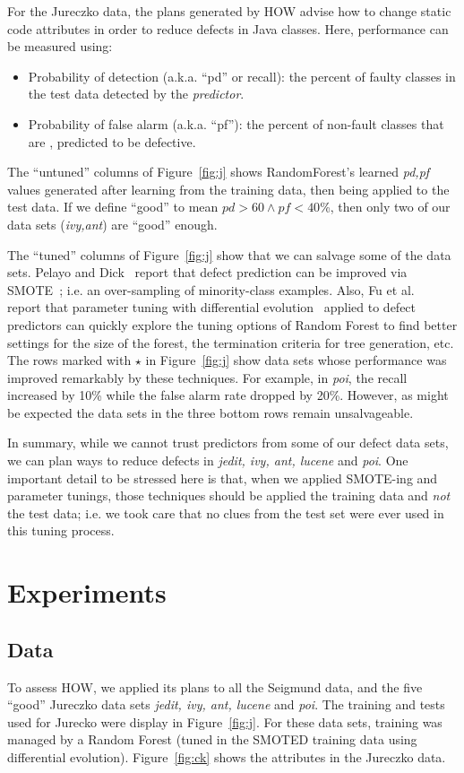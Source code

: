 \documentclass[conference]{IEEEtran}
\newcommand{\bi}{\begin{itemize}}
\newcommand{\ei}{\end{itemize}}
\newcommand{\fig}[1]{Figure~\ref{fig:#1}}
\begin{document}
For the  Jureczko   data,
the plans generated by HOW advise   how to change static code attributes in order to reduce defects in
Java classes.  Here,
performance can be measured using:
\bi
\item Probability of detection (a.k.a. ``pd'' or recall):  the percent of faulty classes in
the test data detected
by the {\em predictor}.
\item Probability of false alarm (a.k.a. ``pf''): the percent of non-fault
classes that are {\e, predicted} to be defective.
\ei 
The ``untuned'' columns of \fig{j} shows RandomForest's learned {\em pd,pf}
values generated after learning from the training data, then being applied to the test data.
If we define ``good'' to mean $\mathit{pd}>60 \wedge \mathit{pf} < 40$\%,
then only two of our data sets ({\em ivy,ant}) are ``good'' enough. 

The ``tuned'' columns of \fig{j} show that we can salvage some of the data sets.
 Pelayo and Dick~\cite{pelayo07} report that defect prediction can be improved via SMOTE~\cite{Chawla2002}; i.e. an over-sampling of minority-class examples.
 Also, Fu et al.~\cite{fu:ase15} report that parameter tuning with differential evolution~\cite{storn97}
applied to defect predictors can quickly explore the tuning
options of Random Forest to find better settings for the size of the forest, the termination criteria
for tree generation, etc.
The rows marked with $\star$ in \fig{j} show data sets whose performance was improved remarkably by these
techniques. For example, in {\em poi}, the recall increased by 10\% while the false alarm rate dropped by 20\%.
However,  as might be expected
the data sets in the  three bottom rows remain
unsalvageable.

In summary, while we cannot trust predictors from some of our defect data sets,
we can plan ways to reduce defects in {\em jedit, ivy, ant, lucene} and {\em poi}.
One important detail to be stressed here is that, when we applied    SMOTE-ing and
parameter tunings, those techniques should be applied the training data and {\em not}
the test data;  
i.e.
we took care that no clues from the test set were ever used in this tuning process.


 

\section{Experiments}

\subsection{Data}
To assess HOW, we applied its plans to all the Seigmund data, and the five ``good''
  Jureczko   data sets {\em jedit, ivy, ant, lucene} and {\em poi}.
  The training and tests used for Jurecko were display in \fig{j}. For these data
  sets, training was managed by a Random Forest (tuned in the SMOTED training data using differential
  evolution). \fig{ck} shows the attributes in the Jureczko data.
  
\end{document}
